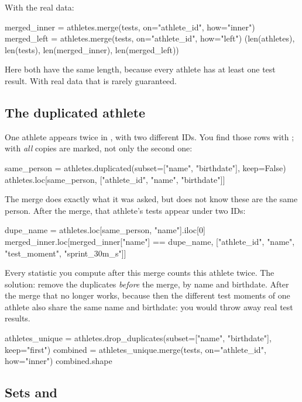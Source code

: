 \documentclass[11pt,a4paper]{article}
\begin{document}
With the real data:

\begin{python}
merged_inner = athletes.merge(tests, on="athlete_id", how="inner")
merged_left = athletes.merge(tests, on="athlete_id", how="left")
(len(athletes), len(tests), len(merged_inner), len(merged_left))
\end{python}

Here both have the same length, because every athlete has at least one
test result. With real data that is rarely guaranteed.

\subsection{The duplicated athlete}

One athlete appears twice in , with two different IDs. You
find those rows with ; with 
\emph{all} copies are marked, not only the second one:

\begin{python}
same_person = athletes.duplicated(subset=["name", "birthdate"], keep=False)
athletes.loc[same_person, ["athlete_id", "name", "birthdate"]]
\end{python}

The merge does exactly what it was asked, but does not know these are
the same person. After the merge, that athlete's tests appear under two
IDs:

\begin{python}
dupe_name = athletes.loc[same_person, "name"].iloc[0]
merged_inner.loc[merged_inner["name"] == dupe_name,
                 ["athlete_id", "name", "test_moment", "sprint_30m_s"]]
\end{python}

Every statistic you compute after this merge counts this athlete twice.
The solution: remove the duplicates \emph{before} the merge, by name and
birthdate. After the merge that no longer works, because then the
different test moments of one athlete also share the same name and
birthdate: you would throw away real test results.

\begin{python}
athletes_unique = athletes.drop_duplicates(subset=["name", "birthdate"], keep="first")
combined = athletes_unique.merge(tests, on="athlete_id", how="inner")
combined.shape
\end{python}

\subsection{Sets and }
\end{document}
